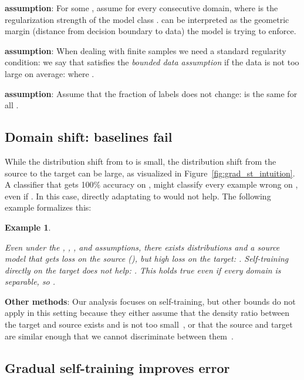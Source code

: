 \documentclass[11pt]{article}
\newtheorem{example}[theorem]{Example}
\begin{document}
\textbf{\GradShiftAssump{} assumption}: For some , assume  for every consecutive domain, where  is the regularization strength of the model class .  can be interpreted as the geometric margin (distance from decision boundary to data) the model is trying to enforce.

\textbf{\BoundedAssump{} assumption}: When dealing with finite samples we need a standard regularity condition: we say that  satisfies the \emph{bounded data assumption} if the data is not too large on average:  where .

\textbf{\NoLabShiftAssump{} assumption}: Assume that the fraction of  labels does not change:  is the same for all . 

\subsection{Domain shift: baselines fail}

While the distribution shift from  to  is small, the distribution shift from the source  to the target  can be large, as visualized in Figure~\ref{fig:grad_st_intuition}.
A classifier that gets 100\% accuracy on , might classify every example wrong on , even if .
In this case, directly adaptating to  would not help.
The following example formalizes this:

\newcommand{\baselinesFailText}{
  Even under the \sepAssump, \noLabShiftAssump, \gradShiftAssump, and \boundedAssump{} assumptions, there exists distributions  and a source model  that gets  loss on the source (), but high loss on the target: . Self-training directly on the target does not help: . This holds true even if every domain is separable, so .
}

\begin{example}
\label{ex:baselinesFail}
\baselinesFailText{}
\end{example}

\textbf{Other methods}: Our analysis focuses on self-training, but other bounds do not apply in this setting because they either assume that the density ratio between the target and source exists and is not too small~\cite{huang2006correcting}, or that the source and target are similar enough that we cannot discriminate between them~\cite{ben2010theory}.





\subsection{Gradual self-training improves error}
\end{document}
